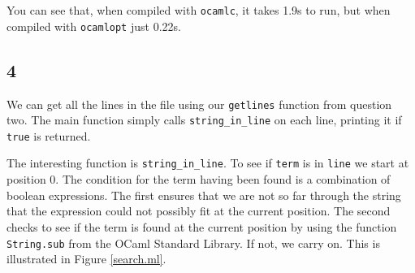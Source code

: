 \documentclass[]{book}
\begin{document}
\noindent You can see that, when compiled with \texttt{ocamlc}, it takes 1.9s to run, but when compiled with \texttt{ocamlopt} just 0.22s.

\subsection*{4}
We can get all the lines in the file using our \texttt{getlines} function from question two. The main function simply calls \texttt{string\_in\_line} on each line, printing it if \texttt{true} is returned.

The interesting function is \texttt{string\_in\_line}. To see if \texttt{term} is in \texttt{line} we start at position 0. The condition for the term having been found is a combination of boolean expressions. The first ensures that we are not so far through the string that the expression could not possibly fit at the current position. The second checks to see if the term is found at the current position by using the function \texttt{String.sub} from the OCaml Standard Library. If not, we carry on. This is illustrated in Figure \ref{search.ml}.
\end{document}
